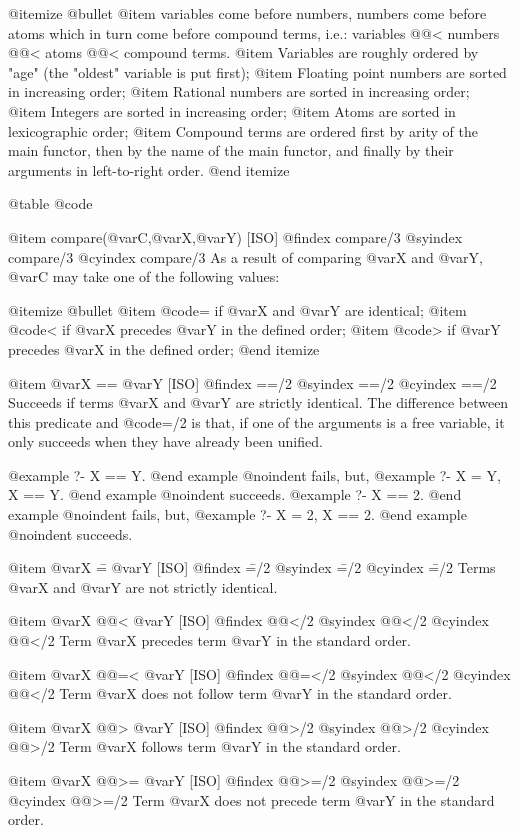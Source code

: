 {{{{@itemize @bullet
@item
variables come before numbers, numbers come before atoms which in turn
come before compound terms, i.e.: variables @@< numbers @@< atoms @@<
compound terms.
@item
Variables are roughly ordered by "age" (the "oldest" variable is put
first);
@item
Floating point numbers are sorted in increasing order;
@item
Rational numbers are sorted in increasing order;
@item
Integers are sorted in increasing order;
@item
Atoms are sorted in lexicographic order;
@item
Compound terms are ordered first by arity of the main functor, then by
the name of the main functor, and finally by their arguments in
left-to-right order.
@end itemize

@table @code

@item compare(@var{C},@var{X},@var{Y}) [ISO]
@findex compare/3
@syindex compare/3
@cyindex compare/3
As a result of comparing @var{X} and @var{Y}, @var{C} may take one of
the following values:

@itemize @bullet
@item
@code{=} if @var{X} and @var{Y} are identical;
@item
@code{<} if @var{X} precedes @var{Y} in the defined order;
@item
@code{>} if @var{Y} precedes @var{X} in the defined order;
@end itemize

@item @var{X} == @var{Y} [ISO]
@findex ==/2
@syindex ==/2
@cyindex ==/2
Succeeds if terms @var{X} and @var{Y} are strictly identical. The
difference between this predicate and @code{=/2} is that, if one of the
arguments is a free variable, it only succeeds when they have already
been unified.

@example
?- X == Y.
@end example
@noindent
fails, but,
@example
?- X = Y, X == Y.
@end example
@noindent
succeeds.
@example
?- X == 2.
@end example
@noindent
fails, but,
@example
?- X = 2, X == 2.
@end example
@noindent
succeeds.


@item @var{X} \== @var{Y} [ISO]
@findex \==/2
@syindex \==/2
@cyindex \==/2
Terms @var{X} and @var{Y} are not strictly identical.

@item @var{X} @@< @var{Y} [ISO]
@findex @@</2
@syindex @@</2
@cyindex @@</2
Term @var{X} precedes term @var{Y} in the standard order.

@item @var{X} @@=< @var{Y} [ISO]
@findex @@=</2
@syindex @@</2
@cyindex @@</2
Term @var{X} does not follow term @var{Y} in the standard order.

@item @var{X} @@> @var{Y} [ISO]
@findex @@>/2
@syindex @@>/2
@cyindex @@>/2
Term @var{X} follows term @var{Y} in the standard order.

@item @var{X} @@>= @var{Y} [ISO]
@findex @@>=/2
@syindex @@>=/2
@cyindex @@>=/2
Term @var{X} does not precede term @var{Y} in the standard order.

}}}}
